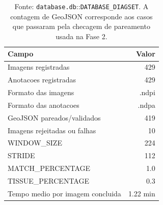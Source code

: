 \begin{table}[!htb]
\centering
\caption{Ingestao e extracao inicial de DIAGSET antes da geracao de patches.}
\label{tab:results_diagset-stage2-ingestion}
\small
\begin{tabular}{lr}
\toprule
Campo & Valor \\
\midrule
Imagens registradas & 429 \\
Anotacoes registradas & 429 \\
Formato das imagens & .ndpi \\
Formato das anotacoes & .ndpa \\
GeoJSON pareados/validados & 419 \\
Imagens rejeitadas ou falhas & 10 \\
WINDOW\_SIZE & 224 \\
STRIDE & 112 \\
MATCH\_PERCENTAGE & 1.0 \\
TISSUE\_PERCENTAGE & 0.3 \\
Tempo medio por imagem concluida & 1.22 min \\
\bottomrule
\end{tabular}
\caption*{\footnotesize Fonte: \texttt{database.db}::\texttt{DATABASE\_DIAGSET}. A contagem de GeoJSON corresponde aos casos que passaram pela checagem de pareamento usada na Fase 2.}
\end{table}
